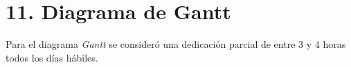 \documentclass[
11pt, %
]{charter}
\begin{document}


\section{11. Diagrama de Gantt}
\label{sec:gantt}

Para el diagrama \textit{Gantt} se consideró una dedicación parcial de entre 3 y 4 horas todos los días
hábiles.




\end{document}
